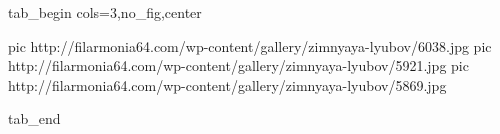  
 
 
 
 


\ifcmt
  tab_begin cols=3,no_fig,center

     pic http://filarmonia64.com/wp-content/gallery/zimnyaya-lyubov/6038.jpg
		 pic http://filarmonia64.com/wp-content/gallery/zimnyaya-lyubov/5921.jpg
		 pic http://filarmonia64.com/wp-content/gallery/zimnyaya-lyubov/5869.jpg

  tab_end
\fi
